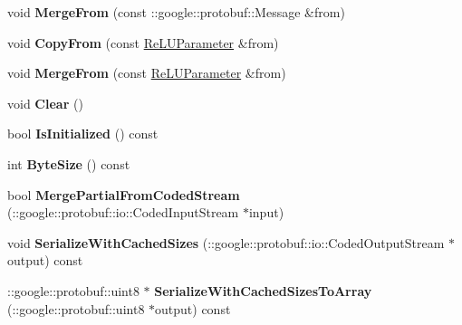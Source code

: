 \begin{DoxyCompactItemize}
void {\bfseries Merge\+From} (const \+::google\+::protobuf\+::\+Message \&from)
\item 
\mbox{\label{classcaffe_1_1_re_l_u_parameter_ad5ee51a8a540122f81fad7afc2cbf27b}} 
void {\bfseries Copy\+From} (const \mbox{\hyperlink{classcaffe_1_1_re_l_u_parameter}{Re\+L\+U\+Parameter}} \&from)
\item 
\mbox{\label{classcaffe_1_1_re_l_u_parameter_a86cf4fc0954f01ad61bf7aa272b07596}} 
void {\bfseries Merge\+From} (const \mbox{\hyperlink{classcaffe_1_1_re_l_u_parameter}{Re\+L\+U\+Parameter}} \&from)
\item 
\mbox{\label{classcaffe_1_1_re_l_u_parameter_a6b2354e96f096f5fb089c177bc8e5d64}} 
void {\bfseries Clear} ()
\item 
\mbox{\label{classcaffe_1_1_re_l_u_parameter_a88aaf0b5014b7cf38f253a6ffc8fa08b}} 
bool {\bfseries Is\+Initialized} () const
\item 
\mbox{\label{classcaffe_1_1_re_l_u_parameter_ac9ed0c9a4f2603db0856f0fdf7a8bb63}} 
int {\bfseries Byte\+Size} () const
\item 
\mbox{\label{classcaffe_1_1_re_l_u_parameter_aed7d6691e29da5aba37528ea2fa297fa}} 
bool {\bfseries Merge\+Partial\+From\+Coded\+Stream} (\+::google\+::protobuf\+::io\+::\+Coded\+Input\+Stream $\ast$input)
\item 
\mbox{\label{classcaffe_1_1_re_l_u_parameter_a296a160746d29180581cfd3197e696b2}} 
void {\bfseries Serialize\+With\+Cached\+Sizes} (\+::google\+::protobuf\+::io\+::\+Coded\+Output\+Stream $\ast$output) const
\item 
\mbox{\label{classcaffe_1_1_re_l_u_parameter_ac6538ca1fcd94333b52ed62c0c34c936}} 
\+::google\+::protobuf\+::uint8 $\ast$ {\bfseries Serialize\+With\+Cached\+Sizes\+To\+Array} (\+::google\+::protobuf\+::uint8 $\ast$output) const
\item 
\mbox{\label{classcaffe_1_1_re_l_u_parameter_a5293c8b50fa992f8847d18d0c6b7d36c}} 

\end{DoxyCompactItemize}
